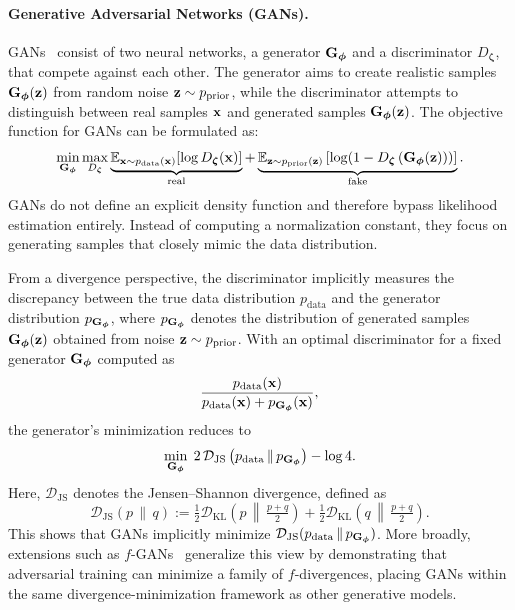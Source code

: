 \paragraph{Generative Adversarial Networks (GANs).}
GANs~\citep{goodfellow2014generative} consist of two neural networks, a generator $ {\mathbf{G}}_{\bm{\phi}} $ and a discriminator $ D_{\bm{\zeta}} $, that compete against each other. The generator aims to create realistic samples $ {\mathbf{G}}_{\bm{\phi}}({\mathbf{z}}) $ from random noise $ {\mathbf{z}} \sim p_{\mathrm{prior}}$, while the discriminator attempts to distinguish between real samples $ {\mathbf{x}} $ and generated samples $ {\mathbf{G}}_{\bm{\phi}}({\mathbf{z}}) $. The objective function for GANs can be formulated as:
\begin{equation*}
    \min_{{\mathbf{G}}_{\bm{\phi}}} \max_{D_{\bm{\zeta}}} \underbrace{\mathbb{E}_{{\mathbf{x}} \sim p_{\mathrm{data}}({\mathbf{x}})}[\log D_{\bm{\zeta}}({\mathbf{x}})]}_{\text{real}} + \underbrace{\mathbb{E}_{{\mathbf{z}} \sim p_{\mathrm{prior}}({\mathbf{z}})}\left[\log(1 - D_{\bm{\zeta}}\left({\mathbf{G}}_{\bm{\phi}}({\mathbf{z}}))\right)\right]}_{\text{fake}}.
\end{equation*}
GANs do not define an explicit density function and therefore bypass likelihood estimation entirely. 
Instead of computing a normalization constant, they focus on generating samples that closely mimic the data distribution. 

From a divergence perspective, the discriminator implicitly measures the discrepancy between the true data distribution $p_{\mathrm{data}}$ 
and the generator distribution $p_{{\mathbf{G}}_{{\bm{\phi}}}}$, where $p_{{\mathbf{G}}_{{\bm{\phi}}}}$ denotes the distribution of generated samples ${\mathbf{G}}_{{\bm{\phi}}}({\mathbf{z}})$ obtained from noise ${\mathbf{z}} \sim p_{\mathrm{prior}}$. 
With an optimal discriminator for a fixed generator ${\mathbf{G}}_{{\bm{\phi}}}$ computed as
\begin{equation*}
     \frac{p_{\mathrm{data}}({\mathbf{x}})}{p_{\mathrm{data}}({\mathbf{x}}) + p_{{\mathbf{G}}_{{\bm{\phi}}}}({\mathbf{x}})},
\end{equation*}
the generator’s minimization reduces to
\begin{equation*}
    \min_{{\mathbf{G}}_{{\bm{\phi}}}} \; 2\,\mathcal{D}_\mathrm{JS} \left(p_{\mathrm{data}} \,\|\, p_{{\mathbf{G}}_{\bm{\phi}}}\right) - \log 4.
\end{equation*}
Here, $\mathcal{D}_\mathrm{JS}$ denotes the Jensen–Shannon divergence, defined as
\begin{equation*}
    \mathcal{D}_\mathrm{JS}(p \,\|\, q) 
    := \tfrac{1}{2} \mathcal{D}_\mathrm{KL} \left(p \,\middle\|\, \tfrac{p+q}{2}\right) 
    + \tfrac{1}{2} \mathcal{D}_\mathrm{KL} \left(q \,\middle\|\, \tfrac{p+q}{2}\right).
\end{equation*}
This shows that GANs implicitly minimize $\mathcal{D}_\mathrm{JS}(p_{\mathrm{data}} \,\|\, p_{{\mathbf{G}}_{\bm{\phi}}})$. 
More broadly, extensions such as $f$-GANs~\citep{nowozin2016f} generalize this view by demonstrating that adversarial training can minimize a family of $f$-divergences, 
placing GANs within the same divergence-minimization framework as other generative models.


